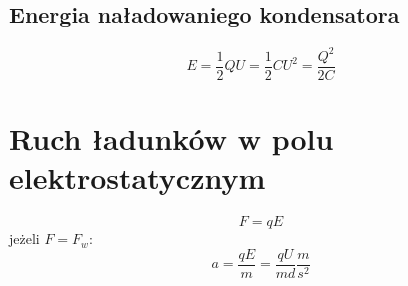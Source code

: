       \subsection{Energia naładowaniego kondensatora}
        \begin{equation}
          E = \frac{1}{2}QU = \frac{1}{2}CU^2 = \frac{Q^2}{2C}
        \end{equation}
    \section{Ruch ładunków w polu elektrostatycznym}
      \begin{equation}
        F = qE
      \end{equation}
      jeżeli $F = F_w$:
      \begin{equation}
        a = \frac{qE}{m} = \frac{qU}{md} \unit{\frac{m}{s^2}}
      \end{equation}
